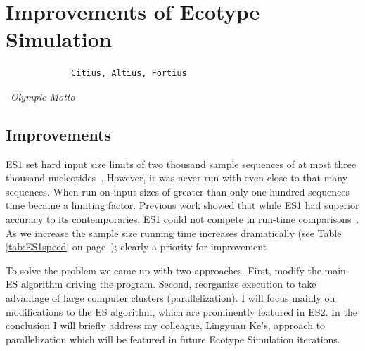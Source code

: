 \gobbletocpage
\chapter{Improvements of Ecotype Simulation}
\restoretocpage

\begin{shadequote}
\begin{center}
    \Large\begin{verbatim} 
             Citius, Altius, Fortius
 \end{verbatim}  
\end{center}
\par--\emph{Olympic Motto}
\end{shadequote}


\section{Improvements}
ES1 set hard input size limits of two thousand sample sequences of at most three thousand nucleotides~\cite{koeppel2008identifying}.
However, it was never run with even close to that many sequences.
When run on input sizes of greater than only one hundred sequences time became a limiting factor.
Previous work showed that while ES1 had superior  accuracy to its contemporaries, ES1 could not compete in run-time comparisons~\cite{carlo}.
As we increase the sample size running time increases dramatically (see Table \ref{tab:ES1speed} on page~\pageref{tab:ES1speed}); clearly a priority for improvement

To solve the problem we came up with two approaches.
First, modify the main ES algorithm driving the program.
Second, reorganize execution to take advantage of large computer clusters (parallelization).
I will focus mainly on modifications to the ES algorithm, which are prominently featured in ES2.
In the conclusion I will briefly address my colleague, Lingyuan Ke's, approach to parallelization which will be featured in future Ecotype Simulation iterations.


